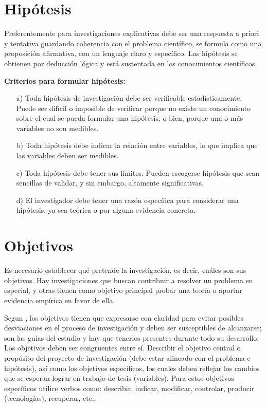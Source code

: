 \section{Hipótesis}
Preferentemente para investigaciones explicativas debe ser una respuesta a priori y tentativa guardando coherencia con el problema científico, se formula como una proposición afirmativa, con un lenguaje claro y específico.  Las hipótesis se obtienen por deducción lógica y está sustentada en los conocimientos científicos. \par  
\vskip 0.3cm
{\bf Criterios para formular hipótesis:} \cite{Erica}
\begin{enumerate}
\item[a)] Toda hipótesis de investigación debe ser verificable estadísticamente.  Puede ser difícil o imposible de verificar porque no existe un conocimiento sobre el cual se pueda formular una hipótesis, o bien, porque una o más variables no son medibles.
\vskip 0.2cm
\item[b)] Toda hipótesis debe indicar la relación entre variables, lo que implica que las variables deben ser medibles.
\vskip 0.2cm
\item[c)] Toda hipótesis debe tener sus límites. Pueden escogerse hipótesis que sean sencillas de validar, y sin embargo, altamente significativas.
\vskip 0.2cm
\item[d)] El investigador debe tener una razón específica para considerar una hipótesis, ya sea teórica o por alguna evidencia concreta.    
\end{enumerate}





\section{Objetivos}
Es necesario establecer qué pretende la investigación, es decir, cuáles son sus objetivos. Hay investigaciones que buscan contribuir a resolver un problema en especial, y otras tienen como objetivo principal probar una teoría o aportar evidencia empírica en favor de ella. \par 
\vskip 0.3cm
Segun \cite{Rojas}, los objetivos tienen que expresarse con claridad para evitar posibles desviaciones en el proceso de investigación y deben ser susceptibles de alcanzarse; son las guías del estudio y hay que tenerlos presentes durante todo su desarrollo. Los objetivos deben ser congruentes entre sí.
\vskip 0.3cm
Describir el objetivo central o propósito del proyecto de investigación (debe estar alineado con el problema e hipótesis), así como los objetivos específicos, los cuales deben reflejar los cambios que se esperan lograr en trabajo de tesis (variables). Para estos objetivos específicos utilice verbos como: describir, indicar, modificar, controlar, producir (tecnologías), recuperar, etc..

